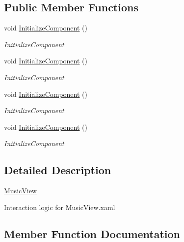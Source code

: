 \subsection*{Public Member Functions}
\begin{DoxyCompactItemize}
\item 
void \hyperlink{class_presentation_1_1_view_1_1_music_view_ad544f1791f3fd9b81adde25bbc9a90cf}{Initialize\+Component} ()
\begin{DoxyCompactList}\small\item\em Initialize\+Component \end{DoxyCompactList}\item 
void \hyperlink{class_presentation_1_1_view_1_1_music_view_ad544f1791f3fd9b81adde25bbc9a90cf}{Initialize\+Component} ()
\begin{DoxyCompactList}\small\item\em Initialize\+Component \end{DoxyCompactList}\item 
void \hyperlink{class_presentation_1_1_view_1_1_music_view_ad544f1791f3fd9b81adde25bbc9a90cf}{Initialize\+Component} ()
\begin{DoxyCompactList}\small\item\em Initialize\+Component \end{DoxyCompactList}\item 
void \hyperlink{class_presentation_1_1_view_1_1_music_view_ad544f1791f3fd9b81adde25bbc9a90cf}{Initialize\+Component} ()
\begin{DoxyCompactList}\small\item\em Initialize\+Component \end{DoxyCompactList}\end{DoxyCompactItemize}


\subsection{Detailed Description}
\hyperlink{class_presentation_1_1_view_1_1_music_view}{Music\+View} 

Interaction logic for Music\+View.\+xaml 

\subsection{Member Function Documentation}
\mbox{\label{class_presentation_1_1_view_1_1_music_view_ad544f1791f3fd9b81adde25bbc9a90cf}} 
